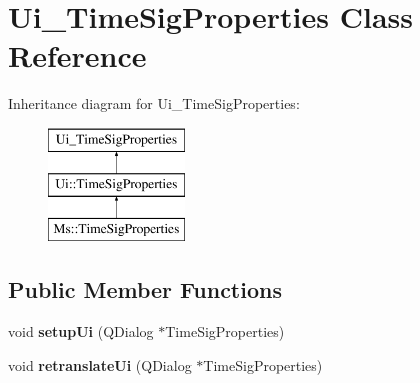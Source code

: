\hypertarget{class_ui___time_sig_properties}{}\section{Ui\+\_\+\+Time\+Sig\+Properties Class Reference}
\label{class_ui___time_sig_properties}
Inheritance diagram for Ui\+\_\+\+Time\+Sig\+Properties\+:\begin{figure}[H]
\begin{center}
\leavevmode
\includegraphics[height=3.000000cm]{class_ui___time_sig_properties}
\end{center}
\end{figure}
\subsection*{Public Member Functions}
\begin{DoxyCompactItemize}
\item 
\mbox{\label{class_ui___time_sig_properties_a6cf25d598a51b7883ece4de1c94907de}} 
void {\bfseries setup\+Ui} (Q\+Dialog $\ast$Time\+Sig\+Properties)
\item 
\mbox{\label{class_ui___time_sig_properties_aa98f3fd69f2be7f842c97cb9757f65e3}} 
void {\bfseries retranslate\+Ui} (Q\+Dialog $\ast$Time\+Sig\+Properties)
\end{DoxyCompactItemize}
